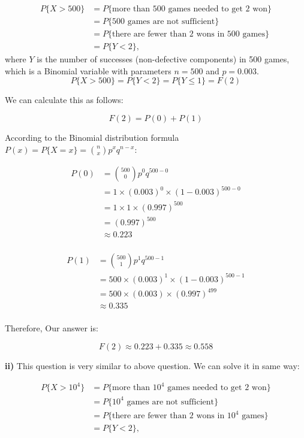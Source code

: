 \documentclass[12pt]{article}
\begin{document}
\begin{align*}
P\{X > 500\} &= P\{ \text{more than 500 games needed to get 2 won} \} \\
            &= P\{ \text{500 games are not sufficient} \} \\
            &= P\{ \text{there are fewer than 2 wons in 500 games} \} \\
            &= P\{Y < 2\} ,
\end{align*}
where \( Y \) is the number of successes (non-defective components) in 500 games, which is a Binomial variable with parameters \( n = 500 \) and \( p = 0.003 \).
\[ P\{X > 500\} = P\{Y < 2\} = P\{Y \leq 1\} = F(2) \]

We can calculate this as follows:

\[ F(2) = P(0) + P(1) \]

According to the Binomial distribution formula $P(x) = P\{X = x\} = \binom{n}{x} p^x q^{n-x}$:

\begin{align*}
P(0) &=   \binom{500}{0} p^0 q^{500-0}\\
     &=   1 \times (0.003)^0 \times (1-0.003)^{500-0} \\
     &=   1 \times 1 \times (0.997)^{500} \\
     &=   (0.997)^{500} \\
     &\approx   0.223\\
\end{align*}

\begin{align*}
P(1) &=   \binom{500}{1} p^1 q^{500-1}\\
     &=   500 \times (0.003)^1 \times (1-0.003)^{500-1} \\
     &=   500 \times (0.003) \times (0.997)^{499} \\
     &\approx   0.335\\
\end{align*}

Therefore, Our answer is:

\[ F(2) \approx 0.223 + 0.335 \approx 0.558\]

\textbf{ii)} This question is very similar to above question. We can solve it in same way:

\begin{align*}
P\{X > 10^4\} &= P\{ \text{more than $10^4$ games needed to get 2 won} \} \\
            &= P\{ \text{$10^4$ games are not sufficient} \} \\
            &= P\{ \text{there are fewer than 2 wons in $10^4$ games} \} \\
            &= P\{Y < 2\} ,
\end{align*}
\end{document}
